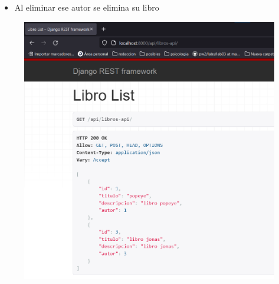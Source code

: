 \documentclass{article}
\begin{document}
	\begin{itemize}
		\item Al eliminar ese autor se elimina su libro
	\end{itemize}
	\begin{figure}[H]
		\centering
		\includegraphics[width=1\textwidth,keepaspectratio]{pruebas/tarea-libros-eliminadoAutor.png}
	\end{figure}
	\clearpage
	
\end{document}
